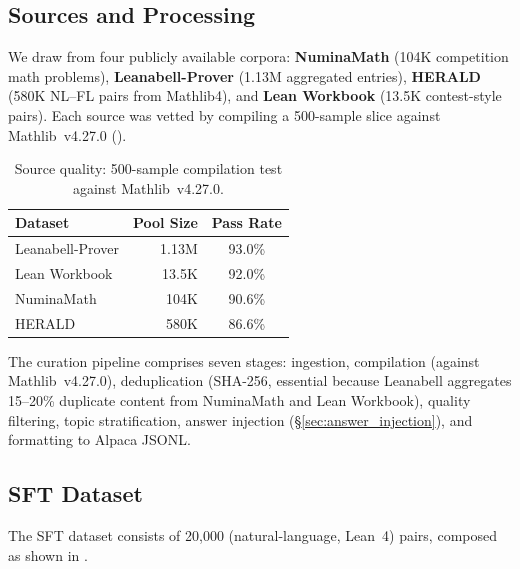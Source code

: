 \documentclass[11pt,a4paper]{article}
\begin{document}
\subsection{Sources and Processing}\label{sec:sources}

We draw from four publicly available corpora: \textbf{NuminaMath} \citep{li2024numinamath} (104K competition math problems), \textbf{Leanabell-Prover} \citep{stoney2025leanabell} (1.13M aggregated entries), \textbf{HERALD} \citep{gao2025herald} (580K NL--FL pairs from Mathlib4), and \textbf{Lean Workbook} \citep{he2024leanworkbook} (13.5K contest-style pairs). Each source was vetted by compiling a 500-sample slice against Mathlib~v4.27.0 ().

\begin{table}[t]
\centering
\caption{Source quality: 500-sample compilation test against Mathlib~v4.27.0.}
\label{tab:source_quality}
\begin{tabular}{@{}lrc@{}}
\toprule
\textbf{Dataset} & \textbf{Pool Size} & \textbf{Pass Rate} \\
\midrule
Leanabell-Prover \citep{stoney2025leanabell} & 1.13M & 93.0\% \\
Lean Workbook \citep{he2024leanworkbook} & 13.5K & 92.0\% \\
NuminaMath \citep{li2024numinamath} & 104K & 90.6\% \\
HERALD \citep{gao2025herald} & 580K & 86.6\% \\
\bottomrule
\end{tabular}
\end{table}

The curation pipeline comprises seven stages: ingestion, compilation (against Mathlib~v4.27.0), deduplication (SHA-256, essential because Leanabell aggregates 15--20\% duplicate content from NuminaMath and Lean Workbook), quality filtering, topic stratification, answer injection (\S\ref{sec:answer_injection}), and formatting to Alpaca JSONL.

\subsection{SFT Dataset}\label{sec:sft_data}

The SFT dataset consists of 20{,}000 (natural-language, Lean~4) pairs, composed as shown in .
\end{document}
